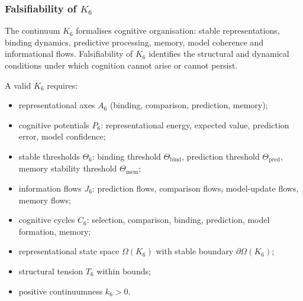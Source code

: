 
\subsubsection{Falsifiability of \texorpdfstring{$K_6$}{K_6}}
\label{sec:falsifiability-k6}

The continuum $K_6$ formalises cognitive organisation:  
stable representations, binding dynamics, predictive processing,
memory, model coherence and informational flows.
Falsifiability of $K_6$ identifies the structural and dynamical
conditions under which cognition cannot arise or cannot persist.

A valid $K_6$ requires:

\begin{itemize}
    \item representational axes $A_6$ (binding, comparison, prediction, memory);
    \item cognitive potentials $P_6$: representational energy,
          expected value, prediction error, model confidence;
    \item stable thresholds $\Theta_6$: binding threshold $\Theta_{\mathrm{bind}}$,
          prediction threshold $\Theta_{\mathrm{pred}}$,
          memory stability threshold $\Theta_{\mathrm{mem}}$;
    \item information flows $J_6$: prediction flows, comparison flows,
          model-update flows, memory flows;
    \item cognitive cycles $C_6$:
          selection, comparison, binding, prediction, model formation, memory;
    \item representational state space $\Omega(K_6)$ with stable
          boundary $\partial\Omega(K_6)$;
    \item structural tension $T_6$ within bounds;
    \item positive continuumness $k_6>0$.
\end{itemize}

